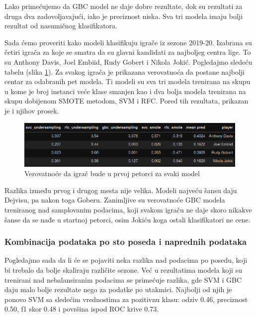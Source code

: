 \documentclass[a4paper]{article}
\begin{document}
Lako primećujemo da GBC model ne daje dobre rezultate, dok su rezultati
za druga dva zadovoljavajući, iako je preciznost niska. Sva tri modela imaju
bolji rezultat od nasumičnog klasifikatora.

Sada ćemo proveriti kako modeli klasifikuju igrače iz sezone 2019-20. Izabrana su četiri igrača za koje se smatra da su glavni kandidati za najboljeg centra lige. To su Anthony Davis, Joel Embiid, Rudy Gobert i Nikola Jokić. Pogledajmo sledeću tabelu (slika \ref{plt:clf_pg}). Za svakog igrača je prikazana verovatnoća da postane najbolji centar za odabranih pet modela. Ti modeli su sva tri modela trenirana na skupu u kome je broj instanci veće klase smanjen kao i dva bolja modela trenirana na skupu dobijenom SMOTE metodom, SVM i RFC. Pored tih rezultata, prikazan je i njihov prosek.

\begin{figure}[h!]
\begin{center}
\includegraphics[scale=0.50]{clf_pg.png}
\end{center}
\caption{Verovatnoće da igrač bude u prvoj petorci za svaki model}
\label{plt:clf_pg}
\end{figure}

Razlika između prvog i drugog mesta nije velika. Modeli najveću šansu daju
Dejvisu, pa nakon toga Goberu. Zanimljive su verovatnoće GBC modela treniranog nad samplovanim podacima, koji svakom igraču ne daje skoro nikakve šanse da se nađe u startnoj petorci, osim Jokiću koga ostali klasifikatori ne cene.

\subsubsection{Kombinacija podataka po sto poseda i naprednih podataka}
\label{subsubsec:kombo_pp_adv}

Pogledajmo sada da li će se pojaviti neka razlika nad podacima po posedu,
koji bi trebalo da bolje skaliraju različite sezone. Već u rezultatima modela
koji su trenirani nad nebalansiranim podacima se primećuje razlika, gde SVM i
GBC daju malo bolje rezultate nego za podatke po utakmici. Najbolji od njih je
ponovo SVM sa sledećim vrednostima za pozitivnu klasu: odziv 0.46, preciznost
0.50, f1 skor 0.48 i površina ispod ROC krive 0.73.
\end{document}
